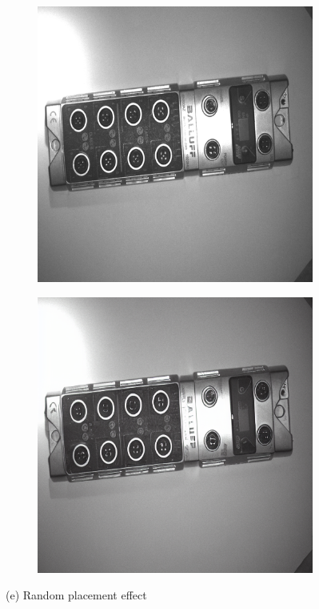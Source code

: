 \documentclass[12pt,DIV14,BCOR12mm,a4paper,footinclude=false,headinclude,parskip=half-,twoside,openright,cleardoublepage=empty,toc=index,bibliography=totoc,listof=totoc]{scrreprt}
\numberwithin{equation}{chapter}
\begin{document}
\begin{figure}
    \vspace{0.3cm} %

    \begin{subfigure}[t]{0.45\textwidth}
        \centering
        \includegraphics[width=\textwidth]{../media/diff_bni_random_real.png}
    \end{subfigure}%
    \hspace{0.02\textwidth}%
    \begin{subfigure}[t]{0.45\textwidth}
        \centering
        \includegraphics[width=\textwidth]{../media/diff_bni_random_fake.png}
    \end{subfigure}
    \caption*{(e) Random placement effect}


\end{figure}
\end{document}
